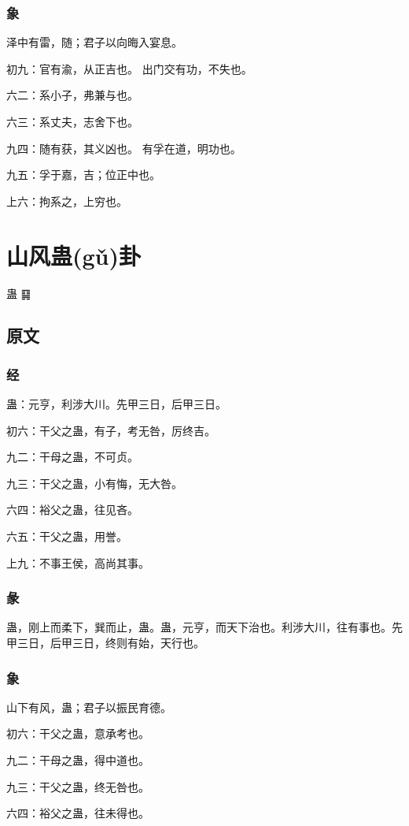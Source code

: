 \documentclass[12pt,oneside]{book}
\begin{document}
\subsection{象}
泽中有雷，随；君子以向晦入宴息。

初九：官有渝，从正吉也。 出门交有功，不失也。

六二：系小子，弗兼与也。

六三：系丈夫，志舍下也。

九四：随有获，其义凶也。 有孚在道，明功也。

九五：孚于嘉，吉；位正中也。

上六：拘系之，上穷也。

\chapter{山风蛊(gǔ)卦}
蛊 {\Large ䷑}

\section{原文}

\subsection{经}
蛊：元亨，利涉大川。先甲三日，后甲三日。

初六：干父之蛊，有子，考无咎，厉终吉。

九二：干母之蛊，不可贞。

九三：干父之蛊，小有悔，无大咎。

六四：裕父之蛊，往见吝。

六五：干父之蛊，用誉。

上九：不事王侯，高尚其事。

\subsection{彖}
蛊，刚上而柔下，巽而止，蛊。蛊，元亨，而天下治也。利涉大川，往有事也。先甲三日，后甲三日，终则有始，天行也。

\subsection{象}
山下有风，蛊；君子以振民育德。

初六：干父之蛊，意承考也。

九二：干母之蛊，得中道也。

九三：干父之蛊，终无咎也。

六四：裕父之蛊，往未得也。
\end{document}
